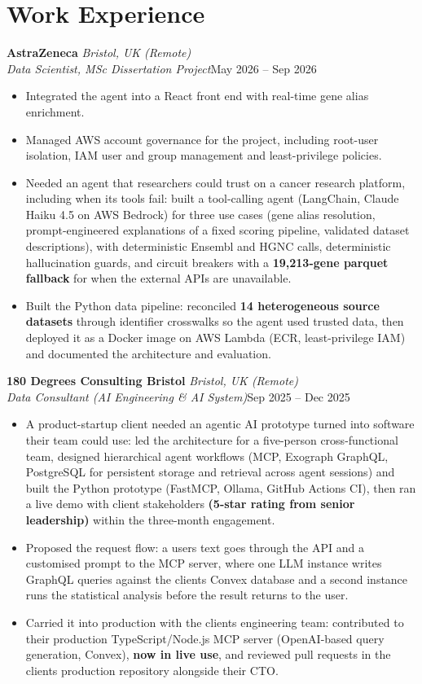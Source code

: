 \documentclass[a4paper,11pt]{article}
\newcommand{\role}[4]{%
  \textbf{#1}{\color{muted}\,\textperiodcentered\,\textit{#2}}\\
  \textit{#4}\hfill{\color{muted}#3}\par}
\newcommand{\gap}{\vspace{5pt}}
\newcommand{\num}[1]{\textbf{#1}}   %
\begin{document}
\section{Work Experience}
\role{AstraZeneca}{Bristol, UK (Remote)}{May 2026 – Sep 2026}{Data Scientist, MSc Dissertation Project}
\begin{itemize}
  \item Integrated the agent into a React front end with real-time gene alias enrichment.
  \item Managed AWS account governance for the project, including root-user isolation, IAM user and group management and least-privilege policies.
  \item Needed an agent that researchers could trust on a cancer research platform, including when its tools fail: built a tool-calling agent (LangChain, Claude Haiku 4.5 on AWS Bedrock) for three use cases (gene alias resolution, prompt-engineered explanations of a fixed scoring pipeline, validated dataset descriptions), with deterministic Ensembl and HGNC calls, deterministic hallucination guards, and circuit breakers with a \num{19,213-gene parquet fallback} for when the external APIs are unavailable.
  \item Built the Python data pipeline: reconciled \num{14 heterogeneous source datasets} through identifier crosswalks so the agent used trusted data, then deployed it as a Docker image on AWS Lambda (ECR, least-privilege IAM) and documented the architecture and evaluation.
\end{itemize}
\gap
{}
\role{180 Degrees Consulting Bristol}{Bristol, UK (Remote)}{Sep 2025 – Dec 2025}{Data Consultant (AI Engineering \& AI System)}
\begin{itemize}
  \item A product-startup client needed an agentic AI prototype turned into software their team could use: led the architecture for a five-person cross-functional team, designed hierarchical agent workflows (MCP, Exograph GraphQL, PostgreSQL for persistent storage and retrieval across agent sessions) and built the Python prototype (FastMCP, Ollama, GitHub Actions CI), then ran a live demo with client stakeholders \num{(5-star rating from senior leadership)} within the three-month engagement.
  \item Proposed the request flow: a user\textquotesingle{}s text goes through the API and a customised prompt to the MCP server, where one LLM instance writes GraphQL queries against the client\textquotesingle{}s Convex database and a second instance runs the statistical analysis before the result returns to the user.
  \item Carried it into production with the client\textquotesingle{}s engineering team: contributed to their production TypeScript/Node.js MCP server (OpenAI-based query generation, Convex), \num{now in live use}, and reviewed pull requests in the client\textquotesingle{}s production repository alongside their CTO.
\end{itemize}
\end{document}
